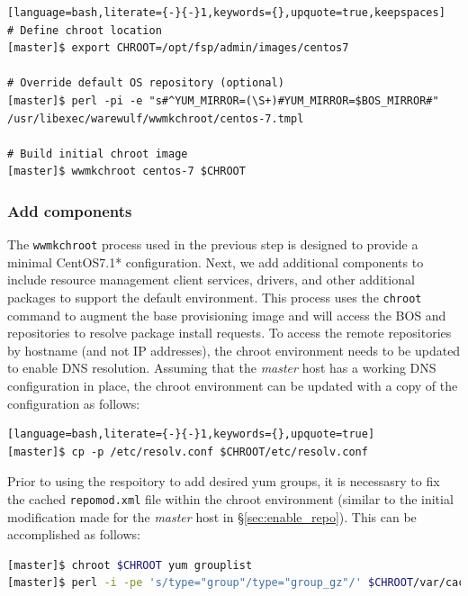 \documentclass[letterpaper]{article}
\newcommand{\baseOS}{CentOS7.1*}
\begin{document}
\begin{lstlisting}[language=bash,literate={-}{-}1,keywords={},upquote=true,keepspaces]
# Define chroot location 
[master]$ export CHROOT=/opt/fsp/admin/images/centos7

# Override default OS repository (optional)
[master]$ perl -pi -e "s#^YUM_MIRROR=(\S+)#YUM_MIRROR=$BOS_MIRROR#" /usr/libexec/warewulf/wwmkchroot/centos-7.tmpl

# Build initial chroot image
[master]$ wwmkchroot centos-7 $CHROOT
\end{lstlisting}

\subsubsection{Add \FSP{} components}

The \texttt{wwmkchroot} process used in the previous step is designed to
provide a minimal \baseOS{} configuration. Next, we add additional components to
include resource management client services, \InfiniBand{} drivers, and other
additional packages to support the default \FSP{} environment.  This process uses
the \texttt{chroot} command to augment the base provisioning image and will
access the BOS and \FSP{} repositories to resolve package install requests. To
access the remote repositories by hostname (and not IP addresses), the chroot
environment needs to be updated to enable DNS resolution. Assuming that
the {\em master} host has a working DNS configuration in place, the chroot environment can
be updated with a copy of the configuration as follows:

\begin{lstlisting}[language=bash,literate={-}{-}1,keywords={},upquote=true]
[master]$ cp -p /etc/resolv.conf $CHROOT/etc/resolv.conf
\end{lstlisting}

Prior to using the \FSP{} respoitory to add desired yum groups, it is
necessasry to fix the cached \texttt{repomod.xml} file within the chroot
environment (similar to the initial modification made for the {\em master} host
in \S\ref{sec:enable_repo}). This can be accomplished as follows:

\begin{lstlisting}[language=bash,keywords={}]
[master]$ chroot $CHROOT yum grouplist
[master]$ perl -i -pe 's/type="group"/type="group_gz"/' $CHROOT/var/cache/yum/x86_64/7/ForestPeak_*/repomd.xml
\end{lstlisting}
\end{document}

